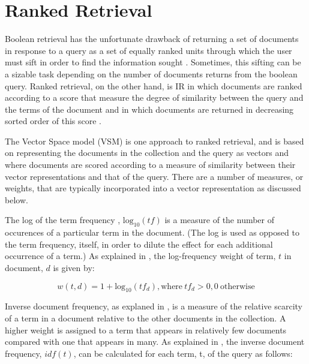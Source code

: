 \section{Ranked Retrieval}

Boolean retrieval has the unfortunate drawback of returning a set of documents in response to a query as a set of equally ranked units through which the user must sift in order to find the information sought \cite{manning_2008_introduction_ch6}.  Sometimes, this sifting can be a sizable task depending on the number of documents returns from the boolean query.  Ranked retrieval, on the other hand, is IR in which documents are ranked according to a score that measure the degree of similarity between the query and the terms of the document and in which documents are returned in decreasing sorted order of this score \cite{manning_2008_introduction_ch6}.  

The Vector Space model (VSM) \cite{manning_2008_introduction_ch6} is one approach to ranked retrieval, and is based on representing the documents in the collection and the query as vectors and where documents are scored according to a measure of similarity between their vector representations and that of the query.  There are a number of measures, or weights, that are typically incorporated into a vector representation as discussed below.

The log of the term frequency \cite{manning_2008_introduction_ch6}, $\textrm{log}_{10}(tf)$ is a measure of the number of occurences of a particular term in the document.  (The log is used as opposed to the term frequency, itself, in order to dilute the effect for each additional occurrence of a term.)  As explained in \cite{manning_2008_introduction_ch6}, the log-frequency weight of term, $t$ in document, $d$ is given by:

\begin{equation}
w(t,d) = 1 + \textrm{log}_{10}(tf_d), \textrm{where}\ tf_d > 0, 0\  \textrm{otherwise}
\end{equation}

Inverse document frequency, as explaned in \cite{manning_2008_introduction_ch6}, is a measure of the relative scarcity of a term in a document relative to the other documents in the collection.  A higher weight is assigned to a term that appears in relatively few documents compared with one that appears in many.  As explained in \cite{manning_2008_introduction_ch6}, the inverse document frequency, $idf(t)$, can be calculated for each term, t, of the query as follows:  

